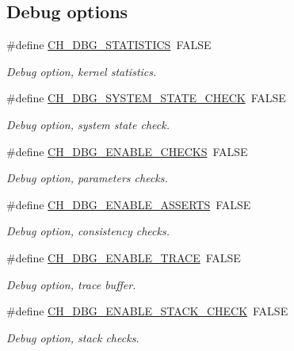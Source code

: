\subsection*{Debug options}
\begin{DoxyCompactItemize}
\item 
\#define \hyperlink{group__config_ga01fa48cf866c26bad886a15c37571f99}{C\+H\+\_\+\+D\+B\+G\+\_\+\+S\+T\+A\+T\+I\+S\+T\+I\+C\+S}~F\+A\+L\+S\+E
\begin{DoxyCompactList}\small\item\em Debug option, kernel statistics. \end{DoxyCompactList}\item 
\#define \hyperlink{group__config_ga10db71bc25605169dddc82c1604b0a16}{C\+H\+\_\+\+D\+B\+G\+\_\+\+S\+Y\+S\+T\+E\+M\+\_\+\+S\+T\+A\+T\+E\+\_\+\+C\+H\+E\+C\+K}~F\+A\+L\+S\+E
\begin{DoxyCompactList}\small\item\em Debug option, system state check. \end{DoxyCompactList}\item 
\#define \hyperlink{group__config_gaef984ca3bfd8a71478ad55ce6e56a8bb}{C\+H\+\_\+\+D\+B\+G\+\_\+\+E\+N\+A\+B\+L\+E\+\_\+\+C\+H\+E\+C\+K\+S}~F\+A\+L\+S\+E
\begin{DoxyCompactList}\small\item\em Debug option, parameters checks. \end{DoxyCompactList}\item 
\#define \hyperlink{group__config_gad602fd2546073869a10859158d865b9b}{C\+H\+\_\+\+D\+B\+G\+\_\+\+E\+N\+A\+B\+L\+E\+\_\+\+A\+S\+S\+E\+R\+T\+S}~F\+A\+L\+S\+E
\begin{DoxyCompactList}\small\item\em Debug option, consistency checks. \end{DoxyCompactList}\item 
\#define \hyperlink{group__config_ga8bc4cfd861131aeb3c880347d0068229}{C\+H\+\_\+\+D\+B\+G\+\_\+\+E\+N\+A\+B\+L\+E\+\_\+\+T\+R\+A\+C\+E}~F\+A\+L\+S\+E
\begin{DoxyCompactList}\small\item\em Debug option, trace buffer. \end{DoxyCompactList}\item 
\#define \hyperlink{group__config_gab93d9ee904f15d4f2c26ef2a1394a1d7}{C\+H\+\_\+\+D\+B\+G\+\_\+\+E\+N\+A\+B\+L\+E\+\_\+\+S\+T\+A\+C\+K\+\_\+\+C\+H\+E\+C\+K}~F\+A\+L\+S\+E
\begin{DoxyCompactList}\small\item\em Debug option, stack checks. \end{DoxyCompactList}\item 

\end{DoxyCompactItemize}
